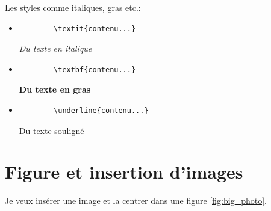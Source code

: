 \documentclass[11pt,a4paper]{article}
\begin{document}
	Les styles comme italiques, gras etc.:
	\begin{itemize}
		\item \begin{verbatim}
		\textit{contenu...}
		\end{verbatim}
		\textit{Du texte en italique}
		
		\item \begin{verbatim}
		\textbf{contenu...}
		\end{verbatim}
		\textbf{Du texte en gras}
		
		\item \begin{verbatim}
		\underline{contenu...}
		\end{verbatim}
		\underline{Du texte souligné}
		\newline
	\end{itemize}

\section{Figure et insertion d'images}
Je veux insérer une image et la centrer dans une figure \ref{fig:big_photo}.
\end{document}
